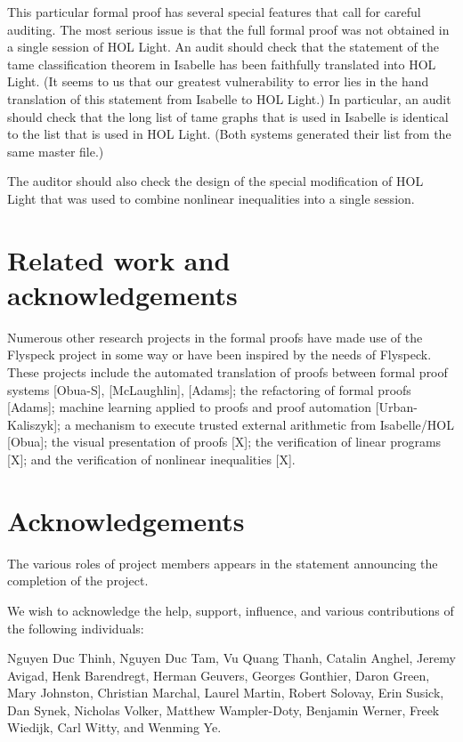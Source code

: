 This particular formal proof has several special features that call for 
careful auditing.  The most serious issue is that the full formal
proof was not obtained in a single session of HOL Light.  An audit
should check that the statement of the tame classification theorem in
Isabelle has been faithfully translated into HOL Light.  (It seems to
us that our greatest vulnerability to error lies in the hand
translation of this statement from Isabelle to HOL Light.)  In
particular, an audit should check that the long list of tame graphs
that is used in Isabelle is identical to the list that is used in HOL
Light.  (Both systems generated their list from the same master file.)

The auditor should also check the
design of the special modification of HOL Light that was used to combine
nonlinear inequalities into a single session.



\section{Related work and acknowledgements}

Numerous other research projects in the formal proofs have made use of
the Flyspeck project in some way or have been inspired by the needs of
Flyspeck.  These projects include the automated translation of proofs
between formal proof systems [Obua-S], [McLaughlin], [Adams]; the
refactoring of formal proofs [Adams]; machine learning applied to
proofs and proof automation [Urban-Kaliszyk]; a mechanism to execute
trusted external arithmetic from Isabelle/HOL [Obua]; the visual
presentation of proofs [X]; the verification of linear programs [X];
and the verification of nonlinear inequalities [X].


\section{Acknowledgements}

The various roles of project members appears in the statement
announcing the completion of the project.

We wish to acknowledge the help, support, influence, and various
contributions of the following individuals:

Nguyen Duc Thinh,  
Nguyen Duc Tam, 
Vu Quang Thanh,
% 
Catalin Anghel, 
Jeremy Avigad, 
Henk Barendregt,
%
Herman Geuvers,
Georges Gonthier,
Daron Green,
Mary Johnston,
Christian Marchal,
Laurel %
Martin, 
%
Robert Solovay,
Erin Susick,
Dan Synek,
Nicholas Volker, 
Matthew Wampler-Doty, 
Benjamin Werner,
Freek Wiedijk, 
Carl Witty, and
Wenming Ye.

